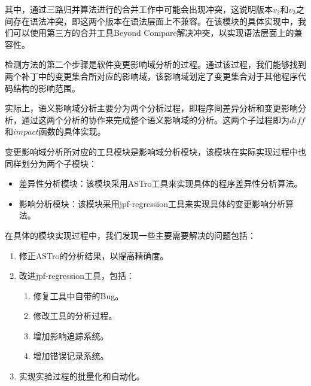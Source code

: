 其中，通过三路归并算法进行的合并工作中可能会出现冲突，这说明版本$v_2$和$v_3$之间存在语法冲突，即这两个版本在语法层面上不兼容。在该模块的具体实现中，我们可以使用第三方的合并工具Beyond Compare解决冲突，以实现语法层面上的兼容性。

%


检测方法的第二个步骤是软件变更影响域分析的过程。通过该过程，我们能够找到两个补丁中的变更集合所对应的影响域，该影响域划定了变更集合对于其他程序代码结构的影响范围。

实际上，语义影响域分析主要分为两个分析过程，即程序间差异分析和变更影响分析，通过这两个分析的协作来完成整个语义影响域的分析。这两个子过程即为$diff$和$impact$函数的具体实现。

变更影响域分析所对应的工具模块是影响域分析模块，该模块在实际实现过程中也同样划分为两个子模块：
\begin{itemize}
	\item 差异性分析模块：该模块采用ASTro工具来实现具体的程序差异性分析算法。
	\item 影响分析模块：该模块采用jpf-regression工具来实现具体的变更影响分析算法。
\end{itemize}

在具体的模块实现过程中，我们发现一些主要需要解决的问题包括：
\begin{enumerate}
	\item 修正ASTro的分析结果，以提高精确度。
	\item 改进jpf-regression工具，包括：
	\begin{enumerate}
		\item 修复工具中自带的Bug。
		\item 修改工具的分析过程。
		\item 增加影响追踪系统。
		\item 增加错误记录系统。
	\end{enumerate}
	
	\item 实现实验过程的批量化和自动化。
\end{enumerate}

